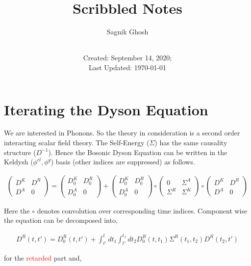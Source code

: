 \documentclass{amsart}
\title{Scribbled Notes}
\author{Sagnik Ghosh}
\date{\\Created: September 14, 2020;\\ Last Updated: \today}
\begin{document}
\maketitle

\section{Iterating the Dyson Equation}
    We are interested in Phonons. So the theory in consideration is a second order interacting scalar field theory. The Self-Energy ($\Sigma$) has the same causality structure ($D^{-1}$). Hence the Bosonic Dyson Equation can be written in the Keldysh ($\phi^{cl},\phi^{q}$) basis (other indices are suppressed) as follows.
    
    \begin{align}
        \begin{pmatrix}
            D^K & D^R \\
            D^A & 0
        \end{pmatrix}
        =
        \begin{pmatrix}
            D_0^K & D_0^R \\
            D_0^A & 0
        \end{pmatrix} 
        +\begin{pmatrix}
            D_0^K & D_0^R \\
            D_0^A & 0
        \end{pmatrix} 
        \circ\begin{pmatrix}
            0 & \Sigma^A \\
            \Sigma^R & \Sigma^K
        \end{pmatrix}
        \circ\begin{pmatrix}
            D^K & D^R \\
            D^A & 0
        \end{pmatrix} 
    \end{align}
    
    Here the $\circ$ denotes convolution over corresponding time indices. Component wise the equation can be decomposed into,
    
    \begin{align}\label{Retarded}
        D^R(t , t') = D_0^R(t, t') + \int^t_{t'} dt_1\int^{t_1}_{t'} dt_2 D_0^R(t, t_1) \Sigma^R (t_1,t_2) D^R(t_2, t')
    \end{align}
    
    for the \textcolor{red}{retarded} part and,
    
\end{document}
